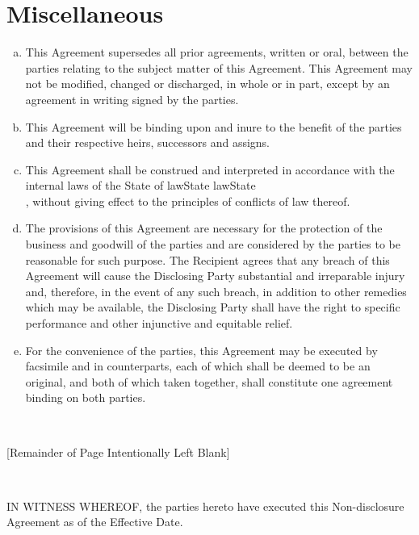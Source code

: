\documentclass[8pt]{article}
\makeatletter
\edef\history{ }
\newcommand{\VAR}[1]{{\color{blue} #1}\g@addto@macro\history{#1\\}}
\newcommand{\BLOCK}[1]{~\newline{ \color{red}#1 }}
\makeatother
\begin{document}
\section{Miscellaneous}
\begin{enumerate}[a)]
\item This Agreement supersedes all prior agreements, written or oral, between the parties relating to the subject matter of this Agreement.  This Agreement may not be modified, changed or discharged, in whole or in part, except by an agreement in writing signed by the parties.
\item This Agreement will be binding upon and inure to the benefit of the parties and their respective heirs, successors and assigns.
\item This Agreement shall be construed and interpreted in accordance with the internal laws of the State of \VAR{lawState}, without giving effect to the principles of conflicts of law thereof.
\item The provisions of this Agreement are necessary for the protection of the business and goodwill of the parties and are considered by the parties to be reasonable for such purpose.  The Recipient agrees that any breach of this Agreement will cause the Disclosing Party substantial and irreparable injury and, therefore, in the event of any such breach, in addition to other remedies which may be available, the Disclosing Party shall have the right to specific performance and other injunctive and equitable relief.
\item For the convenience of the parties, this Agreement may be executed by facsimile and in counterparts, each of which shall be deemed to be an original, and both of which taken together, shall constitute one agreement binding on both parties.
\end{enumerate}

\BLOCK{if toPdf}
\vspace{1cm}
\begin{center}
[Remainder of Page Intentionally Left Blank]
\end{center}
\newpage
\BLOCK{endif}

IN WITNESS WHEREOF, the parties hereto have executed this Non-disclosure Agreement as of the Effective Date.

\renewcommand{\arraystretch}{2}
\setlength\parindent{0pt}

\vspace{2cm}
\end{document}
